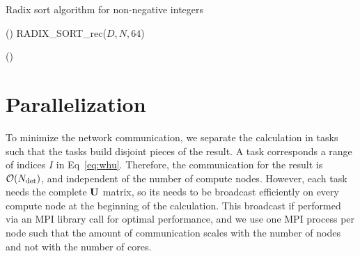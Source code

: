 \documentclass[./thesis.tex]{subfiles}
\begin{document}
\begin{algorithm}
\caption{Radix sort algorithm for non-negative integers}
\label{alg:radix}
\Fn(){}{
 RADIX\_SORT\_rec($D,N,64$) \;
}

\Fn(){}{

}
\end{algorithm}




\section{Parallelization}

To minimize the network communication, we separate the calculation in tasks
such that the tasks build disjoint pieces of the result. A task corresponds a
range of indices $I$ in Eq~\eqref{eq:whu}. Therefore, the communication for the
result is $\order{\Ndet}$, and independent of the number of compute nodes.
However, each task needs the complete $\mathbf{U}$ matrix, so its needs to be
broadcast efficiently on every compute node at the beginning of the
calculation. This broadcast if performed via an MPI library call for optimal
performance,\cite{MPI} and we use one MPI process per node such that the amount of
communication scales with the number of nodes and not with the number of cores.
\end{document}

